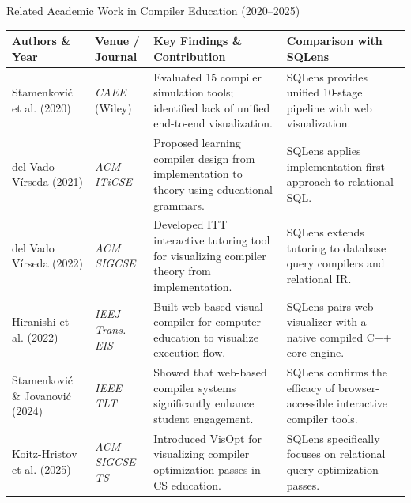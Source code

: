 \documentclass[aspectratio=169,10pt]{beamer}
\begin{document}
\begin{frame}{Related Academic Work in Compiler Education (2020--2025)}
    \begin{table}\footnotesize
    \begin{tabularx}{\textwidth}{l l p{4.6cm} X}
        \toprule
        \textbf{Authors \& Year} & \textbf{Venue / Journal} & \textbf{Key Findings \& Contribution} & \textbf{Comparison with SQLens} \\
        \midrule
        Stamenkovi\'c et al. (2020) & \textit{CAEE} (Wiley) & Evaluated 15 compiler simulation tools; identified lack of unified end-to-end visualization. & SQLens provides unified 10-stage pipeline with web visualization. \\
        del Vado V\'irseda (2021) & \textit{ACM ITiCSE} & Proposed learning compiler design from implementation to theory using educational grammars. & SQLens applies implementation-first approach to relational SQL. \\
        del Vado V\'irseda (2022) & \textit{ACM SIGCSE} & Developed ITT interactive tutoring tool for visualizing compiler theory from implementation. & SQLens extends tutoring to database query compilers and relational IR. \\
        Hiranishi et al. (2022) & \textit{IEEJ Trans. EIS} & Built web-based visual compiler for computer education to visualize execution flow. & SQLens pairs web visualizer with a native compiled C++ core engine. \\
        Stamenkovi\'c \& Jovanovi\'c (2024) & \textit{IEEE TLT} & Showed that web-based compiler systems significantly enhance student engagement. & SQLens confirms the efficacy of browser-accessible interactive compiler tools. \\
        Koitz-Hristov et al. (2025) & \textit{ACM SIGCSE TS} & Introduced VisOpt for visualizing compiler optimization passes in CS education. & SQLens specifically focuses on relational query optimization passes. \\
        \bottomrule
    \end{tabularx}
    \end{table}
\end{frame}
\end{document}
